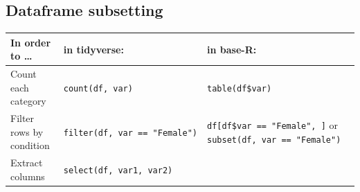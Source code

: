 \documentclass[]{book}
\theoremstyle{definition}
\theoremstyle{definition}
\theoremstyle{definition}
\theoremstyle{remark}
\begin{document}
\subsection*{Dataframe subsetting}\label{dataframe-subsetting}

\begin{longtable}[]{@{}lll@{}}
\toprule
\begin{minipage}[b]{0.29\columnwidth}\raggedright\strut
In order to \ldots{}\strut
\end{minipage} & \begin{minipage}[b]{0.33\columnwidth}\raggedright\strut
in tidyverse:\strut
\end{minipage} & \begin{minipage}[b]{0.30\columnwidth}\raggedright\strut
in base-R:\strut
\end{minipage}\tabularnewline
\midrule
\endhead
\begin{minipage}[t]{0.29\columnwidth}\raggedright\strut
Count each category\strut
\end{minipage} & \begin{minipage}[t]{0.33\columnwidth}\raggedright\strut
\texttt{count(df,\ var)}\strut
\end{minipage} & \begin{minipage}[t]{0.30\columnwidth}\raggedright\strut
\texttt{table(df\$var)}\strut
\end{minipage}\tabularnewline
\begin{minipage}[t]{0.29\columnwidth}\raggedright\strut
Filter rows by condition\strut
\end{minipage} & \begin{minipage}[t]{0.33\columnwidth}\raggedright\strut
\texttt{filter(df,\ var\ ==\ "Female")}\strut
\end{minipage} & \begin{minipage}[t]{0.30\columnwidth}\raggedright\strut
\texttt{df{[}df\$var\ ==\ "Female",\ {]}} or
\texttt{subset(df,\ var\ ==\ "Female")}\strut
\end{minipage}\tabularnewline
\begin{minipage}[t]{0.29\columnwidth}\raggedright\strut
Extract columns\strut
\end{minipage} & \begin{minipage}[t]{0.33\columnwidth}\raggedright\strut
\texttt{select(df,\ var1,\ var2)}\strut
\end{minipage} & \begin{minipage}[t]{0.30\columnwidth}\raggedright\strut

\end{minipage}
\end{longtable}
\end{document}
